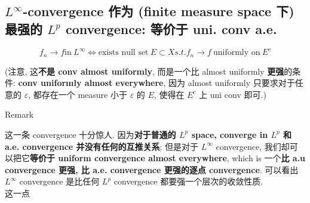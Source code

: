 \subsection{\texorpdfstring{\(L^{\infty}\)-convergence 作为 (finite measure space 下) 最强的 \(L^{p}\) convergence: 等价于 uni. conv a.e.}{L\^{}\{\textbackslash infty\}-convergence 作为 (finite measure space 下) 最强的 L\^{}\{p\} convergence: 等价于 uni. conv a.e.}}\label{linfty-convergence-ux4f5cux4e3a-finite-measure-space-ux4e0b-ux6700ux5f3aux7684-lp-convergence-ux7b49ux4ef7ux4e8e-uni.-conv-a.e.}

\begin{theorem}{}

\[f_{n}\rightarrow f\text{in}\ L^{\infty}\Leftrightarrow\text{exists null set}\ E \subset X s.t.f_{n}\rightarrow f\ \text{uniformly on}\ E^{c}\]

(注意, 这\textbf{不是 conv almost uniformly}, 而是一个比 almost uniformly \textbf{更强}的条件: \textbf{conv uniformly almost everywhere}, 因为 almost uniformly 只要求对于任意的 \(\varepsilon\), 都存在一个 measure 小于 \(\varepsilon\) 的 \(E\), 使得在 \(E^{c}\) 上 uni conv 即可.)

\end{theorem}

\begin{qlremark}{Remark}

这一条 convergence 十分惊人. 因为\textbf{对于普通的 \(L^{p}\) space, converge in \(L^{p}\) 和 a.e. convergence 并没有任何的互推关系}; 但是对于 \(L^{\infty}\) convergence, 我们却可以把它\textbf{等价于 uniform convergence almost everywhere}, which is 一个\textbf{比 a.u convergence 更强, 比 a.e. convergence 更强的逐点 convergence}. 可以看出 \(L^{\infty}\) convergence 是比任何 \(L^{p}\) convergence 都要强一个层次的收敛性质.\\
这一点

\end{qlremark}


